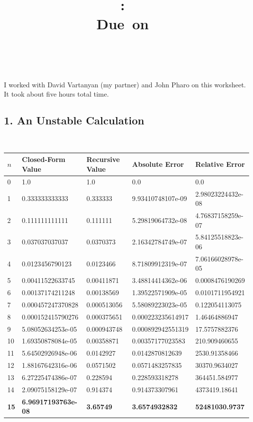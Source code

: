 \documentclass{article}
\title{\vspace{2in}\textmd{\textbf{\hmwkClass:\ \hmwkTitle}}\\\normalsize\vspace{0.1in}\small{Due\ on\ \hmwkDueDate}\\\vspace{0.1in}\large{\textit{\hmwkClassInstructor\ \hmwkClassTime}}\vspace{3in}}
\date{}
\author{\textbf{\hmwkAuthorName}}
\begin{document}
\begin{spacing}{1.1}

\newpage


I worked with David Vartanyan (my partner) and John Pharo on this worksheet. It took about five hours total time.

\subsection{1. An Unstable Calculation}

\begin{table}[H]
	\label{table1}
	\centering
    \begin{tabular}{|l|l|l|l|l|}
	\hline
	
	\(n\) & Closed-Form Value & Recursive Value & Absolute Error & Relative Error \\

	\hline

    0 & 1.0 & 1.0 & 0.0 & 0.0 \\
    1 & 0.333333333333 & 0.333333 & 9.93410748107e-09 & 2.98023224432e-08 \\
    2 & 0.111111111111 & 0.111111 & 5.29819064732e-08 & 4.76837158259e-07 \\
    3 & 0.037037037037 & 0.0370373 & 2.16342784749e-07 & 5.84125518823e-06 \\
    4 & 0.0123456790123 & 0.0123466 & 8.71809912319e-07 & 7.06166028978e-05 \\
    5 & 0.00411522633745 & 0.00411871 & 3.48814414362e-06 & 0.0008476190269 \\
    6 & 0.00137174211248 & 0.00138569 & 1.39522571909e-05 & 0.0101711954921 \\
    7 & 0.000457247370828 & 0.000513056 & 5.58089223023e-05 & 0.122054113075 \\
    8 & 0.000152415790276 & 0.000375651 & 0.000223235614917 & 1.46464886947 \\
    9 & 5.08052634253e-05 & 0.000943748 & 0.000892942551319 & 17.5757882376 \\
    10 & 1.69350878084e-05 & 0.00358871 & 0.00357177023583 & 210.909460655 \\
    11 & 5.64502926948e-06 & 0.0142927 & 0.0142870812639 & 2530.91358466 \\
    12 & 1.88167642316e-06 & 0.0571502 & 0.0571483257835 & 30370.9634027 \\
    13 & 6.27225474386e-07 & 0.228594 & 0.228593318278 & 364451.584977 \\
    14 & 2.09075158129e-07 & 0.914374 & 0.914373307961 & 4373419.18641 \\
    \bf{15} & \bf{6.96917193763e-08} & \bf{3.65749} & \bf{3.6574932832} & \bf{52481030.9737} \\


\end{tabular}
\end{table}
\end{spacing}
\end{document}
